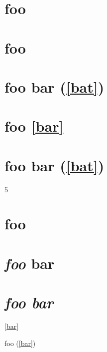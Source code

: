
\def\mytitle{Advanced Headers}


\part{foo  }
\label{bar}

\part{foo}
\label{bar}

\part{foo bar (\autoref{bat})}
\label{foobarbat}

\part{foo \autoref{bar} }
\label{bat}

\part{foo bar (\autoref{bat})}
\label{baz}

5

\part{foo }
\label{bar}

\part{\emph{foo} bar }
\label{foobar}

\part{\emph{foo
bar}}
\label{foobar}

\autoref{bar}

foo (\autoref{bar})



